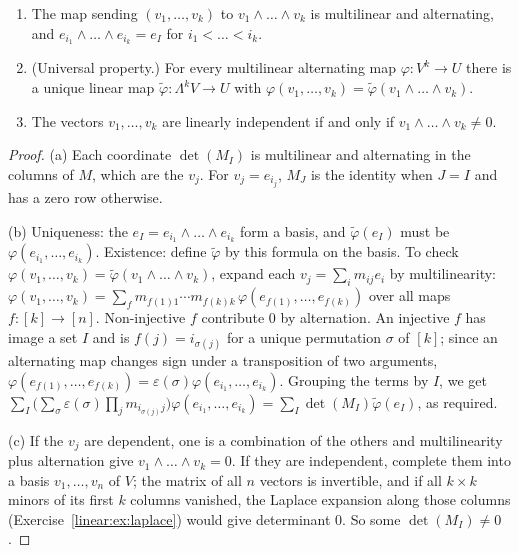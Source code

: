 \begin{theorem}\label{linear:thm:exterior}
\begin{enumerate}[label=(\alph*)]
\item The map sending $(v_1,\dots,v_k)$ to $v_1\wedge\dots\wedge v_k$ is multilinear and alternating, and
$e_{i_1}\wedge\dots\wedge e_{i_k}=e_I$ for $i_1<\dots<i_k$.
\item (Universal property.) For every multilinear alternating map $\varphi:V^k\to U$ there is a unique linear map
$\tilde\varphi:\Lambda^kV\to U$ with $\varphi(v_1,\dots,v_k)=\tilde\varphi(v_1\wedge\dots\wedge v_k)$.
\item The vectors $v_1,\dots,v_k$ are linearly independent if and only if $v_1\wedge\dots\wedge v_k\ne0$.
\end{enumerate}
\end{theorem}
\begin{proof}
(a) Each coordinate $\det(M_I)$ is multilinear and alternating in the columns of $M$, which are the $v_j$. For
$v_j=e_{i_j}$, $M_J$ is the identity when $J=I$ and has a zero row otherwise.

(b) Uniqueness: the $e_I=e_{i_1}\wedge\dots\wedge e_{i_k}$ form a basis, and $\tilde\varphi(e_I)$ must be
$\varphi(e_{i_1},\dots,e_{i_k})$. Existence: define $\tilde\varphi$ by this formula on the basis. To check
$\varphi(v_1,\dots,v_k)=\tilde\varphi(v_1\wedge\dots\wedge v_k)$, expand each $v_j=\sum_im_{ij}e_i$ by multilinearity:
$\varphi(v_1,\dots,v_k)=\sum_fm_{f(1)1}\cdots m_{f(k)k}\,\varphi(e_{f(1)},\dots,e_{f(k)})$ over all maps
$f:[k]\to[n]$. Non-injective $f$ contribute $0$ by alternation. An injective $f$ has image a set $I$ and is
$f(j)=i_{\sigma(j)}$ for a unique permutation $\sigma$ of $[k]$; since an alternating map changes sign under a
transposition of two arguments, $\varphi(e_{f(1)},\dots,e_{f(k)})=\varepsilon(\sigma)\varphi(e_{i_1},\dots,e_{i_k})$. Grouping the
terms by $I$, we get $\sum_I\bigl(\sum_\sigma\varepsilon(\sigma)\prod_jm_{i_{\sigma(j)}j}\bigr)\varphi(e_{i_1},\dots,e_{i_k})=\sum_I\det(M_I)\tilde\varphi(e_I)$,
as required.

(c) If the $v_j$ are dependent, one is a combination of the others and multilinearity plus alternation give
$v_1\wedge\dots\wedge v_k=0$. If they are independent, complete them into a basis $v_1,\dots,v_n$ of $V$; the matrix of all
$n$ vectors is invertible, and if all $k\times k$ minors of its first $k$ columns vanished, the Laplace expansion along
those columns (Exercise~\ref{linear:ex:laplace}) would give determinant $0$. So some $\det(M_I)\ne0$.
\end{proof}

